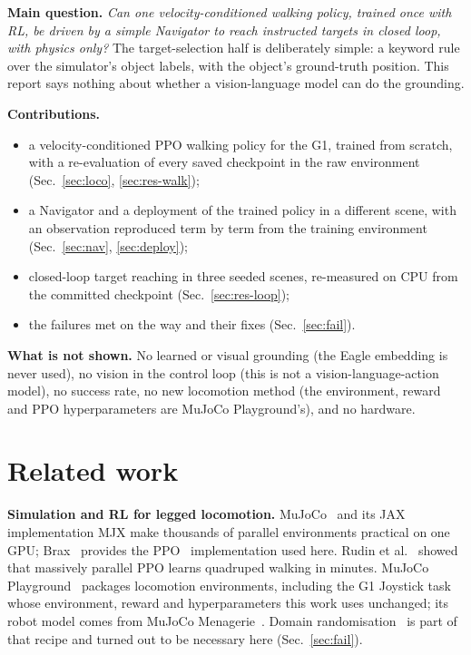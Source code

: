 \documentclass[conference,10pt]{IEEEtran}
\begin{document}
\textbf{Main question.} \emph{Can one velocity-conditioned walking policy, trained once with RL, be driven by a simple
Navigator to reach instructed targets in closed loop, with physics only?} The target-selection half is deliberately
simple: a keyword rule over the simulator's object labels, with the object's ground-truth position. This report says
nothing about whether a vision-language model can do the grounding.

\textbf{Contributions.}
\begin{itemize}
\item a velocity-conditioned PPO walking policy for the G1, trained from scratch, with a re-evaluation of every saved
  checkpoint in the raw environment (Sec.~\ref{sec:loco}, \ref{sec:res-walk});
\item a Navigator and a deployment of the trained policy in a different scene, with an observation reproduced term by
  term from the training environment (Sec.~\ref{sec:nav}, \ref{sec:deploy});
\item closed-loop target reaching in three seeded scenes, re-measured on CPU from the committed checkpoint
  (Sec.~\ref{sec:res-loop});
\item the failures met on the way and their fixes (Sec.~\ref{sec:fail}).
\end{itemize}

\textbf{What is not shown.} No learned or visual grounding (the Eagle embedding is never used), no vision in the
control loop (this is not a vision-language-action model), no success rate, no new locomotion method (the
environment, reward and PPO hyperparameters are MuJoCo Playground's), and no hardware.

\section{Related work}\label{sec:related}
\textbf{Simulation and RL for legged locomotion.} MuJoCo~\cite{todorov2012mujoco} and its JAX implementation MJX make
thousands of parallel environments practical on one GPU; Brax~\cite{freeman2021brax} provides the PPO~\cite{schulman2017ppo}
implementation used here. Rudin et al.~\cite{rudin2022walk} showed that massively parallel PPO learns quadruped walking in
minutes. MuJoCo Playground~\cite{zakka2025playground} packages locomotion environments, including the G1 Joystick task
whose environment, reward and hyperparameters this work uses unchanged; its robot model comes from MuJoCo
Menagerie~\cite{menagerie2022}. Domain randomisation~\cite{tobin2017domain} is part of that recipe and turned out to be
necessary here (Sec.~\ref{sec:fail}).
\end{document}
